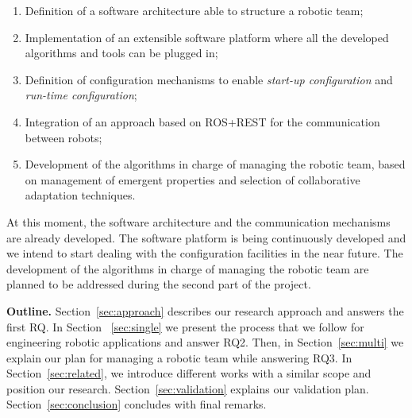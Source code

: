 \begin{enumerate}
\item Definition of a software architecture able to structure a robotic team;
\item Implementation of an extensible software platform where all the developed algorithms and tools can be plugged in;
\item Definition of configuration mechanisms to enable \emph{start-up configuration} and \emph{run-time configuration};
\item Integration of an approach based on ROS+REST for the communication between robots;
\item Development of the algorithms in charge of managing the robotic team, based on management of emergent properties and selection of collaborative adaptation techniques.
\end{enumerate}

At this moment, the software architecture and the communication mechanisms are already developed.
The software platform is being continuously developed and we intend to start dealing with the configuration facilities in the near future.
The development of the algorithms in charge of managing the robotic team are planned to be addressed during the second part of the project.

\textbf{Outline.} 
Section~\ref{sec:approach} describes our research approach and answers the first RQ. %
In Section ~\ref{sec:single} we present the process that we follow for engineering robotic applications and answer RQ2.
Then, in Section~\ref{sec:multi} we explain our plan for managing a robotic team while answering RQ3.
In Section~\ref{sec:related}, we introduce different works with a similar scope and position our research.
Section~\ref{sec:validation} explains our validation plan.
Section~\ref{sec:conclusion} concludes with final remarks.